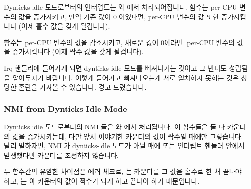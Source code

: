 Dynticks idle 모드로부터의 인터럽트는  와
 에서 처리되어집니다.
 함수는 per-CPU  변수의 값을
증가시키고, 만약 기존 값이 0 이었다면,  per-CPU 변수의 값 또한
증가시킵니다 (이제 홀수 값을 갖게 될겁니다).

 함수는 per-CPU  변수의 값을
감소시키고, 새로운 값이 0이라면,  per-CPU 변수의 값을 증가시킵니다
(이제 짝수 값을 갖게 될겁니다).

Irq 핸들러에 들어가게 되면 dynticks idle 모드를 빠져나가는 것이고 그 반대도
성립됨을 알아두시기 바랍니다.
이렇게 들어가고 빠져나오는게 서로 일치하지 못하는 것은 상당한 혼란을 가져올 수
있습니다.
경고 드렸습니다.
\iffalse

Interrupts from dynticks idle mode are handled by
\co{rcu_irq_enter()} and \co{rcu_irq_exit()}.
The \co{rcu_irq_enter()} function increments the
per-CPU \co{dynticks_nesting} variable, and, if the prior
value was zero, also increments the \co{dynticks}
per-CPU variable (which must then have an odd-numbered value).

The \co{rcu_irq_exit()} function decrements the
per-CPU \co{dynticks_nesting} variable, and, if the new
value is zero, also increments the \co{dynticks}
per-CPU variable (which must then have an even-numbered value).

Note that entering an irq handler exits dynticks idle mode
and vice versa.
This enter/exit anti-correspondence can cause much confusion.
You have been warned.
\fi

\subsubsection{NMI from Dynticks Idle Mode}
\label{app:rcuimpl:rcutree:NMI from Dynticks Idle Mode}

Dynticks idle 모드로부터의 NMI 들은  와 
에서 처리됩니다.
이 함수들은 둘 다  카운터의 값을 증가시키는데, 다만 앞서
이야기한  카운터의 값이 짝수일 때에만 그렇습니다.
달리 말하자면, NMI 가 dynticks-idle 모드가 아닐 때에 또는 인터럽트 핸들러
안에서 발생했다면  카운터를 조정하지 않습니다.

두 함수간의 유일한 차이점은 에러 체크로,  는
 카운터를 그 값을 홀수로 한 채 끝나야 하고,
 는 이 카운터의 값이 짝수가 되게 하고 끝나야 하기
때문입니다.
\iffalse

